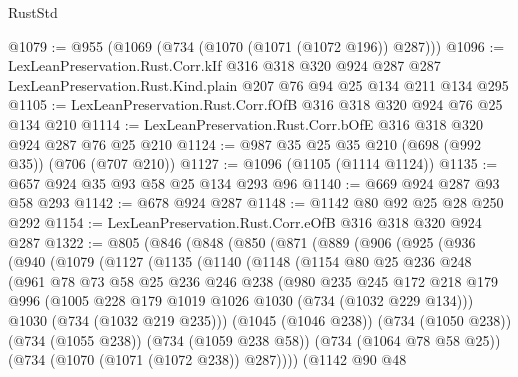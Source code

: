 \begin{lexlean}{RustStd}
\begin{coremodule}
@1079 := @955 (@1069 (@734 (@1070 (@1071 (@1072 @196)) @287)))
@1096 := LexLeanPreservation.Rust.Corr.kIf
    @316
    @318
    @320
    @924
    @287
    @287
    LexLeanPreservation.Rust.Kind.plain
    @207
    @76
    @94
    @25
    @134
    @211
    @134
    @295
@1105 := LexLeanPreservation.Rust.Corr.fOfB @316 @318 @320 @924 @76 @25 @134 @210
@1114 := LexLeanPreservation.Rust.Corr.bOfE @316 @318 @320 @924 @287 @76 @25 @210
@1124 := @987 @35 @25 @35 @210 (@698 (@992 @35)) (@706 (@707 @210))
@1127 := @1096 (@1105 (@1114 @1124))
@1135 := @657 @924 @35 @93 @58 @25 @134 @293 @96
@1140 := @669 @924 @287 @93 @58 @293
@1142 := @678 @924 @287
@1148 := @1142 @80 @92 @25 @28 @250 @292
@1154 := LexLeanPreservation.Rust.Corr.eOfB @316 @318 @320 @924 @287
@1322 := @805
    (@846
      (@848
        (@850
          (@871
            (@889
              (@906
                (@925
                  (@936
                    (@940
                      (@1079
                        (@1127
                          (@1135
                            (@1140
                              (@1148
                                (@1154
                                  @80
                                  @25
                                  @236
                                  @248
                                  (@961
                                    @78
                                    @73
                                    @58
                                    @25
                                    @236
                                    @246
                                    @238
                                    (@980
                                      @235
                                      @245
                                      @172
                                      @218
                                      @179
                                      @996
                                      (@1005 @228 @179 @1019 @1026 @1030 (@734 (@1032 @229 @134)))
                                      @1030
                                      (@734 (@1032 @219 @235)))
                                    (@1045 (@1046 @238))
                                    (@734 (@1050 @238))
                                    (@734 (@1055 @238))
                                    (@734 (@1059 @238 @58))
                                    (@734 (@1064 @78 @58 @25))
                                    (@734 (@1070 (@1071 (@1072 @238)) @287))))
                                (@1142
                                  @90
                                  @48

\end{coremodule}
\end{lexlean}

